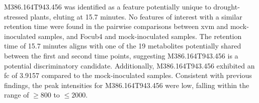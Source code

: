 M386.164T943.456 was identified as a feature potentially unique to drought-stressed plants, eluting at 15.7 minutes. No features of interest with a similar retention time were found in the pairwise comparisons between \ac{xvm} and mock-inoculated samples, and \ac{Focub4} and mock-inoculated samples. The retention time of 15.7 minutes aligns with one of the 19 metabolites potentially shared between the first and second time points, suggesting M386.164T943.456 is a potential discriminatory candidate. Additionally, M386.164T943.456 exhibited an \ac{fc} of 3.9157 compared to the mock-inoculated samples. Consistent with previous findings, the peak intensities for M386.164T943.456 were low, falling within the range of $\geq800$ to $\leq2000$. 





